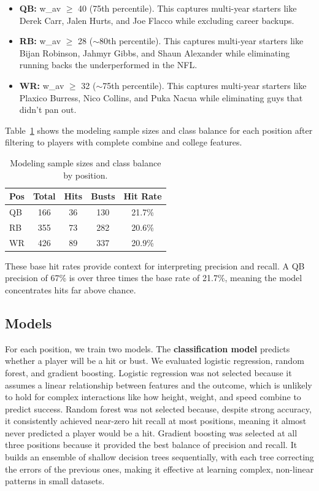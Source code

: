 \documentclass[10pt,twocolumn]{article}
\begin{document}
\begin{itemize}
\setlength\itemsep{0pt}
\item \textbf{QB:} w\_av $\geq$ 40 (75th percentile). This captures multi-year starters like Derek Carr, Jalen Hurts, and Joe Flacco while excluding career backups.
\item \textbf{RB:} w\_av $\geq$ 28 ($\sim$80th percentile). This captures multi-year starters like Bijan Robinson, Jahmyr Gibbs, and Shaun Alexander while eliminating running backs the underperformed in the NFL.
\item \textbf{WR:} w\_av $\geq$ 32 ($\sim$75th percentile). This captures multi-year starters like Plaxico Burress, Nico Collins, and Puka Nacua while eliminating guys that didn't pan out.
\end{itemize}

Table~\ref{tab:samples} shows the modeling sample sizes and class balance for each position after filtering to players with complete combine and college features.
 
\begin{table}[H]
\centering
\small
\begin{tabular}{lcccc}
\toprule
Pos & Total & Hits & Busts & Hit Rate \\
\midrule
QB & 166 & 36 & 130 & 21.7\% \\
RB & 355 & 73 & 282 & 20.6\% \\
WR & 426 & 89 & 337 & 20.9\% \\
\bottomrule
\end{tabular}
\caption{Modeling sample sizes and class balance by position.}
\label{tab:samples}
\end{table}
 
These base hit rates provide context for interpreting precision and recall. A QB precision of 67\% is over three times the base rate of 21.7\%, meaning the model concentrates hits far above chance.

\subsection{Models}

For each position, we train two models. The \textbf{classification model} predicts whether a player will be a hit or bust. We evaluated logistic regression, random forest, and gradient boosting. Logistic regression was not selected because it assumes a linear relationship between features and the outcome, which is unlikely to hold for complex interactions like how height, weight, and speed combine to predict success. Random forest was not selected because, despite strong accuracy, it consistently achieved near-zero hit recall at most positions, meaning it almost never predicted a player would be a hit. Gradient boosting was selected at all three positions because it provided the best balance of precision and recall. It builds an ensemble of shallow decision trees sequentially, with each tree correcting the errors of the previous ones, making it effective at learning complex, non-linear patterns in small datasets.
\end{document}
